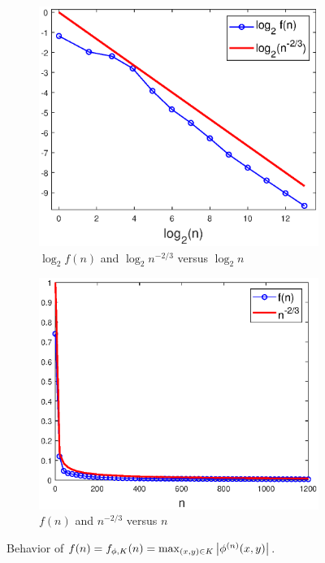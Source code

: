 \documentclass[11pt]{article}
\newenvironment{example}
  {\pushQED{\qed}\renewcommand{\qedsymbol}{$\triangle$}\examplex}
  {\popQED\endexamplex}
\theoremstyle{remark}
\begin{document}
\begin{example}
\begin{figure}[!htb]
    \begin{subfigure}{0.49\textwidth}
    \centering
    \includegraphics[scale=0.58]{Fig9a.eps}
    \caption{$\log_2 f(n)$ and $\log_2 n^{-2/3}$ versus $\log_2 n$}
    \end{subfigure}
    \begin{subfigure}{0.49\textwidth}
    \centering
    \includegraphics[scale=0.58]{Fig9b.eps}
    \caption{$f(n)$ and $n^{-2/3}$ versus $n$}
    \end{subfigure}
    \caption{Behavior of $f(n)=f_{\phi,K}(n)=\max_{(x,y)\in K}\abs{\phi^{(n)}(x,y)}$.}
    \label{fig:Conv_Pwr_5}
\end{figure}



\end{example}
\end{document}
